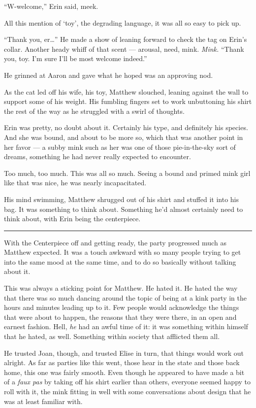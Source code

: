 ``W-welcome,'' Erin said, meek.

All this mention of `toy', the degrading language, it was all so easy to
pick up.

``Thank you, er\ldots{}'' He made a show of leaning forward to check the
tag on Erin's collar. Another heady whiff of that scent --- arousal,
need, mink. \emph{Mink.} ``Thank you, toy. I'm sure I'll be most welcome
indeed.''

He grinned at Aaron and gave what he hoped was an approving nod.

As the cat led off his wife, his toy, Matthew slouched, leaning against
the wall to support some of his weight. His fumbling fingers set to work
unbuttoning his shirt the rest of the way as he struggled with a swirl
of thoughts.

Erin was pretty, no doubt about it. Certainly his type, and definitely
his species. And she was bound, and about to be more so, which that was
another point in her favor --- a subby mink such as her was one of those
pie-in-the-sky sort of dreams, something he had never really expected to
encounter.

Too much, too much. This was all so much. Seeing a bound and primed mink
girl like that was nice, he was nearly incapacitated.

His mind swimming, Matthew shrugged out of his shirt and stuffed it into
his bag. It was something to think about. Something he'd almost
certainly need to think about, with Erin being the centerpiece.

\begin{center}\rule{0.5\linewidth}{\linethickness}\end{center}

With the Centerpiece off and getting ready, the party progressed much as
Matthew expected. It was a touch awkward with so many people trying to
get into the same mood at the same time, and to do so basically without
talking about it.

This was always a sticking point for Matthew. He hated it. He hated the
way that there was so much dancing around the topic of being at a kink
party in the hours and minutes leading up to it. Few people would
acknowledge the things that were about to happen, the reasons that they
were there, in an open and earnest fashion. Hell, \emph{he} had an awful
time of it: it was something within himself that he hated, as well.
Something within society that afflicted them all.

He trusted Joan, though, and trusted Elise in turn, that things would
work out alright. As far as parties like this went, those hear in the
state and those back home, this one was fairly smooth. Even though he
appeared to have made a bit of a \emph{faux pas} by taking off his shirt
earlier than others, everyone seemed happy to roll with it, the mink
fitting in well with some conversations about design that he was at
least familiar with.

